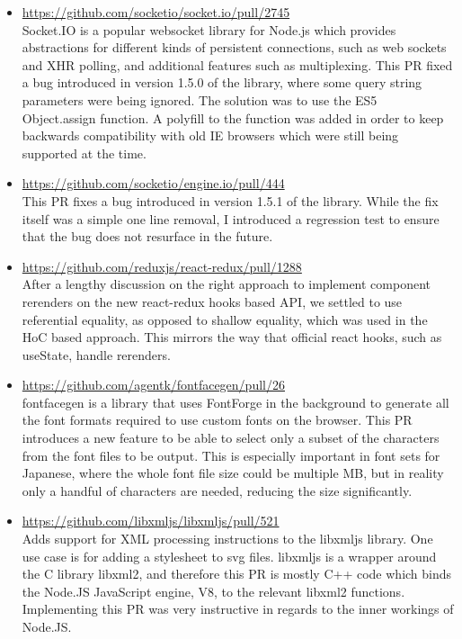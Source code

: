 \documentclass{res}
\begin{document}
\begin{resume}
\begin{itemize}
  \item \url{https://github.com/socketio/socket.io/pull/2745} \\
  Socket.IO is a popular websocket library for Node.js which provides
  abstractions for different kinds of persistent connections, such as web
  sockets and XHR polling, and additional features such as multiplexing.
  This PR fixed a bug introduced in version 1.5.0 of the library, where
  some query string parameters were being ignored. The solution was to use
  the ES5 Object.assign function. A polyfill to the function was added in
  order to keep backwards compatibility with old IE browsers which were
  still being supported at the time.

  \item \url{https://github.com/socketio/engine.io/pull/444} \\
  This PR fixes a bug introduced in version 1.5.1 of the library.
  While the fix itself was a simple one line removal, I introduced a
  regression test to ensure that the bug does not resurface in the future.

  \item \url{https://github.com/reduxjs/react-redux/pull/1288} \\
  After a lengthy discussion on the right approach to implement component rerenders
  on the new react-redux hooks based API, we settled to use referential equality, as
  opposed to shallow equality, which was used in the HoC based approach. This mirrors
  the way that official react hooks, such as useState, handle rerenders.

  \item \url{https://github.com/agentk/fontfacegen/pull/26} \\
  fontfacegen is a library that uses FontForge in the background to generate
  all the font formats required to use custom fonts on the browser. This PR
  introduces a new feature to be able to select only a subset of the
  characters from the font files to be output. This is especially important
  in font sets for Japanese, where the whole font file size could be multiple
  MB, but in reality only a handful of characters are needed, reducing the
  size significantly.

  \item \url{https://github.com/libxmljs/libxmljs/pull/521} \\
  Adds support for XML processing instructions to the libxmljs library.
  One use case is for adding a stylesheet to svg files.
  libxmljs is a wrapper around the C library libxml2, and therefore this
  PR is mostly C++ code which binds the Node.JS JavaScript engine, V8, to
  the relevant libxml2 functions. Implementing this PR was very instructive
  in regards to the inner workings of Node.JS.


\end{itemize}
\end{resume}
\end{document}

